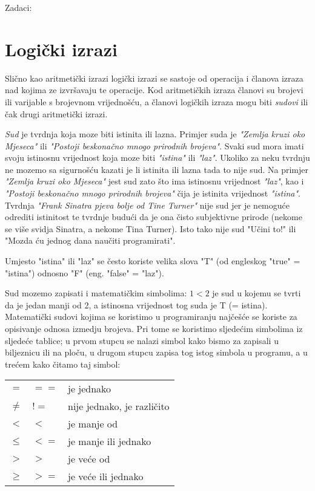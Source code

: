 Zadaci:

\section{Logički izrazi}

Slično kao aritmetički izrazi logički izrazi se sastoje od
operacija i članova izraza nad kojima ze izvršavaju te operacije.
Kod aritmetičkih izraza članovi su brojevi ili varijable s
brojevnom vrijednošću, a članovi logičkih izraza mogu biti
\emph{sudovi} ili čak drugi aritmetički izrazi.

\emph{Sud} je tvrdnja koja moze biti istinita ili lazna. Primjer
suda je \emph{"Zemlja kruzi oko Mjeseca"} ili \emph{"Postoji
beskonačno mnogo prirodnih brojeva"}.  Svaki sud mora imati svoju
istinosnu vrijednost koja moze biti \emph{"istina"} ili \emph{"laz"}.
Ukoliko za neku tvrdnju ne mozemo sa sigurnošću kazati je li
istinita ili lazna tada to nije sud. Na primjer \emph{"Zemlja
kruzi oko Mjeseca"} jest sud zato što ima istinosnu vrijednost
\emph{"laz"}, kao i \emph{"Postoji beskonačno mnogo prirodnih
brojeva"} čija je istinita vrijednost \emph{"istina"}.  Tvrdnja
\emph{"Frank Sinatra pjeva bolje od Tine Turner"} nije sud jer je
nemoguće odrediti istinitost te tvrdnje budući da je ona čisto
subjektivne prirode (nekome se više svidja Sinatra, a nekome Tina
Turner). Isto tako nije sud "Učini to!" ili "Mozda ću jednog
dana naučiti programirati".

Umjesto "istina" ili "laz" se često koriste velika slova "T" (od
engleskog "true" = "istina") odnosno "F" (eng. "false" = "laz").

Sud mozemo zapisati i matematičkim simbolima: $1<2$ je sud u
kojemu se tvrti da je jedan manji od 2, a istinosna vrijednost tog
suda je T (= istina). Matematički sudovi kojima se koristimo u
programiranju najčešće se koriste za opisivanje odnosa izmedju
brojeva. Pri tome se koristimo sljedećim simbolima iz sljedeće tablice;
u prvom stupcu se nalazi simbol kako bismo za zapisali u biljeznicu
ili na ploču, u drugom stupcu zapisa tog istog simbola u programu,
a u trećem kako čitamo taj simbol:

\begin{tabular}{lll}
	$=$ & $==$ & je jednako \\
	$\neq$ & $!=$ & nije jednako, je različito \\
	$<$ & $<$ & je manje od \\
	$\leq$ & $<=$ & je manje ili jednako \\
	$>$ & $>$ & je veće od \\
	$\geq$ & $>=$ & je veće ili jednako
\end{tabular}

